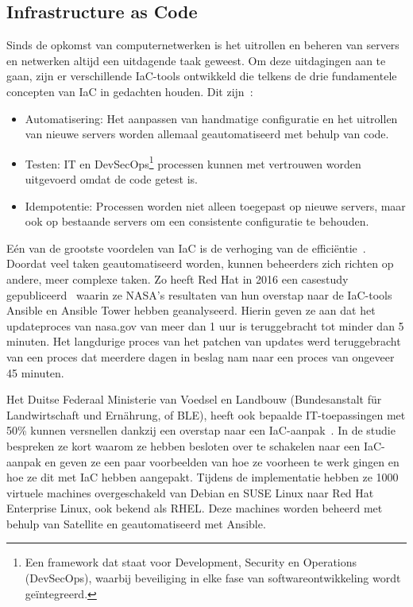 \subsection{Infrastructure as Code}%
\label{sub:iac}

Sinds de opkomst van computernetwerken is het uitrollen en beheren van servers en netwerken altijd een uitdagende taak geweest.
Om deze uitdagingen aan te gaan, zijn er verschillende IaC-tools ontwikkeld die telkens de drie fundamentele concepten van IaC in gedachten houden.
Dit zijn~\autocite{chef-what-is-iac}:
\begin{itemize}
    \item Automatisering: Het aanpassen van handmatige configuratie en het uitrollen van nieuwe servers worden allemaal geautomatiseerd met behulp van code.
    \item Testen: IT en DevSecOps\footnote{Een framework dat staat voor Development, Security en Operations (DevSecOps), waarbij beveiliging in elke fase van softwareontwikkeling wordt ge\"integreerd.} processen kunnen met vertrouwen worden uitgevoerd omdat de code getest is.
    \item Idempotentie: Processen worden niet alleen toegepast op nieuwe servers, maar ook op bestaande servers om een consistente configuratie te behouden.
\end{itemize}

E\'en van de grootste voordelen van IaC is de verhoging van de effici\"entie~\autocite{splunk-benefits-iac}.
Doordat veel taken geautomatiseerd worden, kunnen beheerders zich richten op andere, meer complexe taken.
Zo heeft Red Hat in 2016 een casestudy gepubliceerd~\autocite{case-study-nasa-iac} waarin ze NASA's resultaten van hun overstap naar de IaC-tools Ansible en Ansible Tower hebben geanalyseerd.
Hierin geven ze aan dat het updateproces van nasa.gov van meer dan 1 uur is teruggebracht tot minder dan 5 minuten.
Het langdurige proces van het patchen van updates werd teruggebracht van een proces dat meerdere dagen in beslag nam naar een proces van ongeveer 45 minuten.

Het Duitse Federaal Ministerie van Voedsel en Landbouw (Bundesanstalt f\"ur Landwirtschaft und Ern\"ahrung, of BLE), heeft ook bepaalde IT-toepassingen met 50\% kunnen versnellen dankzij een overstap naar een IaC-aanpak~\autocite{case-study-ble-iac}.
In de studie bespreken ze kort waarom ze hebben besloten over te schakelen naar een IaC-aanpak en geven ze een paar voorbeelden van hoe ze voorheen te werk gingen en hoe ze dit met IaC hebben aangepakt.
Tijdens de implementatie hebben ze 1000 virtuele machines overgeschakeld van Debian en SUSE Linux naar Red Hat Enterprise Linux, ook bekend als RHEL.
Deze machines worden beheerd met behulp van Satellite en geautomatiseerd met Ansible.

